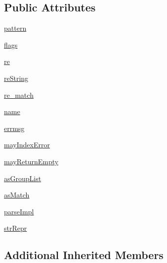 \subsection*{Public Attributes}
\begin{DoxyCompactItemize}
\item 
\hyperlink{classpip_1_1__vendor_1_1pyparsing_1_1Regex_a2ed74ecc3a9dc55ebe66e16de60d67c3}{pattern}
\item 
\hyperlink{classpip_1_1__vendor_1_1pyparsing_1_1Regex_a0a0d4a62fef747d491b7b52a632de44f}{flags}
\item 
\hyperlink{classpip_1_1__vendor_1_1pyparsing_1_1Regex_a9ef19ace89ed17fc2e9ce42e58306c62}{re}
\item 
\hyperlink{classpip_1_1__vendor_1_1pyparsing_1_1Regex_ab0a743189474fb6cc0d654baf14cd6cd}{re\+String}
\item 
\hyperlink{classpip_1_1__vendor_1_1pyparsing_1_1Regex_ace4a99964bf82e370767049d6603038a}{re\+\_\+match}
\item 
\hyperlink{classpip_1_1__vendor_1_1pyparsing_1_1Regex_a78c0a901f48cab95a2432fea73b03bb7}{name}
\item 
\hyperlink{classpip_1_1__vendor_1_1pyparsing_1_1Regex_ac0a9fcbc05a9adeab5731e618094fae5}{errmsg}
\item 
\hyperlink{classpip_1_1__vendor_1_1pyparsing_1_1Regex_ace67ae673245796b3a27528914c9337f}{may\+Index\+Error}
\item 
\hyperlink{classpip_1_1__vendor_1_1pyparsing_1_1Regex_a92457bf231c9ed3e35fec6ffafb4c65c}{may\+Return\+Empty}
\item 
\hyperlink{classpip_1_1__vendor_1_1pyparsing_1_1Regex_af54627850828eeff5296f812ce4b3b0a}{as\+Group\+List}
\item 
\hyperlink{classpip_1_1__vendor_1_1pyparsing_1_1Regex_aa0a6717ee54d3490717b6674554e68a5}{as\+Match}
\item 
\hyperlink{classpip_1_1__vendor_1_1pyparsing_1_1Regex_a90b9632185a8360b6272658596688e17}{parse\+Impl}
\item 
\hyperlink{classpip_1_1__vendor_1_1pyparsing_1_1Regex_a229798dd6f4cc5cbd995d6363ba36267}{str\+Repr}
\end{DoxyCompactItemize}
\subsection*{Additional Inherited Members}


